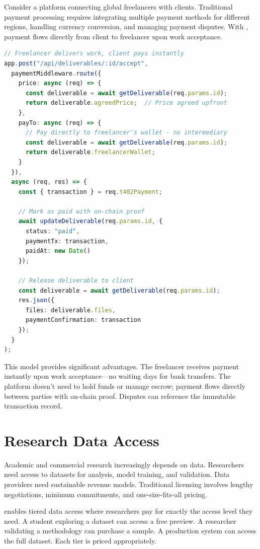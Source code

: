 Consider a platform connecting global freelancers with clients. Traditional payment processing requires integrating multiple payment methods for different regions, handling currency conversion, and managing payment disputes. With \tprotocol{}, payment flows directly from client to freelancer upon work acceptance.

\begin{lstlisting}[language=typescript,caption={Global freelancer payments with direct settlement}]
// Freelancer delivers work, client pays instantly
app.post("/api/deliverables/:id/accept",
  paymentMiddleware.route({
    price: async (req) => {
      const deliverable = await getDeliverable(req.params.id);
      return deliverable.agreedPrice;  // Price agreed upfront
    },
    payTo: async (req) => {
      // Pay directly to freelancer's wallet - no intermediary
      const deliverable = await getDeliverable(req.params.id);
      return deliverable.freelancerWallet;
    }
  }),
  async (req, res) => {
    const { transaction } = req.t402Payment;

    // Mark as paid with on-chain proof
    await updateDeliverable(req.params.id, {
      status: "paid",
      paymentTx: transaction,
      paidAt: new Date()
    });

    // Release deliverable to client
    const deliverable = await getDeliverable(req.params.id);
    res.json({
      files: deliverable.files,
      paymentConfirmation: transaction
    });
  }
);
\end{lstlisting}

This model provides significant advantages. The freelancer receives payment instantly upon work acceptance---no waiting days for bank transfers. The platform doesn't need to hold funds or manage escrow; payment flows directly between parties with on-chain proof. Disputes can reference the immutable transaction record.

\section{Research Data Access}
\label{sec:research-data}

Academic and commercial research increasingly depends on data. Researchers need access to datasets for analysis, model training, and validation. Data providers need sustainable revenue models. Traditional licensing involves lengthy negotiations, minimum commitments, and one-size-fits-all pricing.

\tprotocol{} enables tiered data access where researchers pay for exactly the access level they need. A student exploring a dataset can access a free preview. A researcher validating a methodology can purchase a sample. A production system can access the full dataset. Each tier is priced appropriately.

